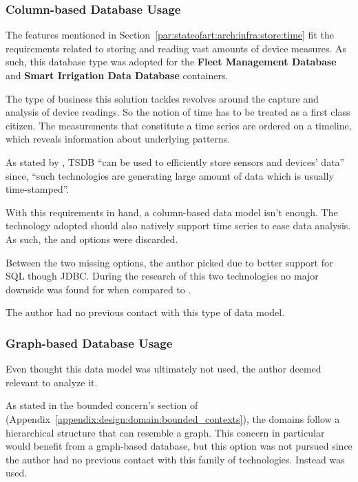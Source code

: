 \subsubsection{Column-based Database Usage}
\label{subsubsec:implementation:decisions:database:time}

The features mentioned in Section~\ref{par:stateofart:arch:infra:store:time} fit the requirements related to storing and reading vast amounts of device measures. As such, this database type was adopted for the \textbf{Fleet Management Database} and \textbf{Smart Irrigation Data Database} containers.

The type of business this solution tackles revolves around the capture and analysis of device readings. So the notion of time has to be treated as a first class citizen. The measurements that constitute a time series are ordered on a timeline, which reveals information about underlying patterns.

As stated by \cite{naqvi2017time}, \gls{TSDB} ``can be used to efficiently store sensors and devices' data'' since, ``such technologies are generating large amount of data which is usually time-stamped''.

With this requirements in hand, a column-based data model isn't enough. The technology adopted should also natively support time series to ease data analysis. As such, the  and  options were discarded.

Between the two missing options, the author picked  due to better support for \gls{SQL} though \gls{JDBC}. During the research of this two technologies no major downside was found for  when compared to .

The author had no previous contact with this type of data model.

\subsubsection{Graph-based Database Usage}
\label{subsubsec:implementation:decisions:database:identity}

Even thought this data model was ultimately not used, the author deemed relevant to analyze it.

As stated in the bounded concern's section of~ (Appendix~\ref{appendix:design:domain:bounded_contexts}), the domains follow a hierarchical structure that can resemble a graph. This concern in particular would benefit from a graph-based database, but this option was not pursued since the author had no previous contact with this family of technologies. Instead  was used.

